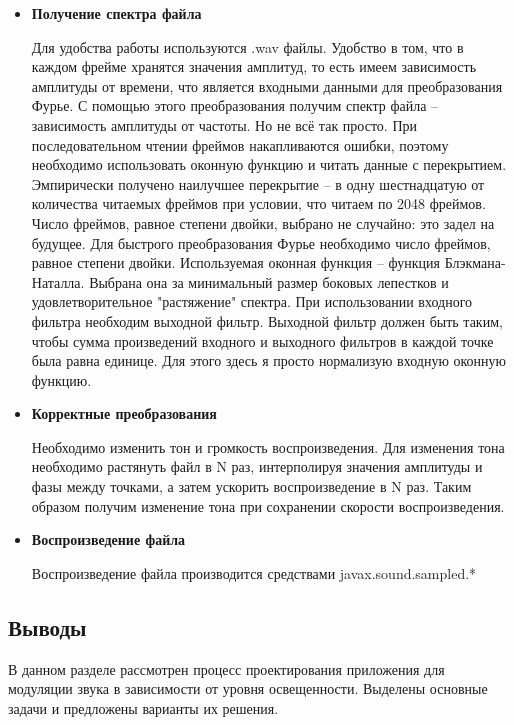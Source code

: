 \documentclass[a4paper]{article}
\begin{document}
\begin{itemize}

\item \textbf{Получение спектра файла}

Для удобства работы используются .wav файлы. Удобство в том, что в каждом фрейме хранятся значения амплитуд, то есть имеем зависимость амплитуды от времени, что является входными данными для преобразования Фурье. С помощью этого преобразования получим спектр файла -- зависимость амплитуды от частоты. Но не всё так просто. При последовательном чтении фреймов накапливаются ошибки, поэтому необходимо использовать оконную функцию и читать данные с перекрытием. Эмпирически получено наилучшее перекрытие -- в одну шестнадцатую от количества читаемых фреймов при условии, что читаем по 2048 фреймов. Число фреймов, равное степени двойки, выбрано не случайно: это задел на будущее. Для быстрого преобразования Фурье необходимо число фреймов, равное степени двойки. Используемая оконная функция  -- функция Блэкмана-Наталла. Выбрана она за минимальный размер боковых лепестков и удовлетворительное "растяжение" спектра. При использовании входного фильтра необходим выходной фильтр. Выходной фильтр должен быть таким, чтобы сумма произведений входного и выходного фильтров в каждой точке была равна единице. Для этого здесь я просто нормализую входную оконную функцию.

\item \textbf{Корректные преобразования}

Необходимо изменить тон и громкость воспроизведения. Для изменения тона необходимо растянуть файл в N раз, интерполируя значения амплитуды и фазы между точками, а затем ускорить воспроизведение в N раз. Таким образом получим изменение тона при сохранении скорости воспроизведения.

\item \textbf{Воспроизведение файла}

Воспроизведение файла производится средствами javax.sound.sampled.*

\end{itemize}

\subsection{Выводы}

В данном разделе рассмотрен процесс проектирования приложения для модуляции звука в зависимости от уровня освещенности. Выделены основные задачи и предложены варианты их решения. 
\end{document}
